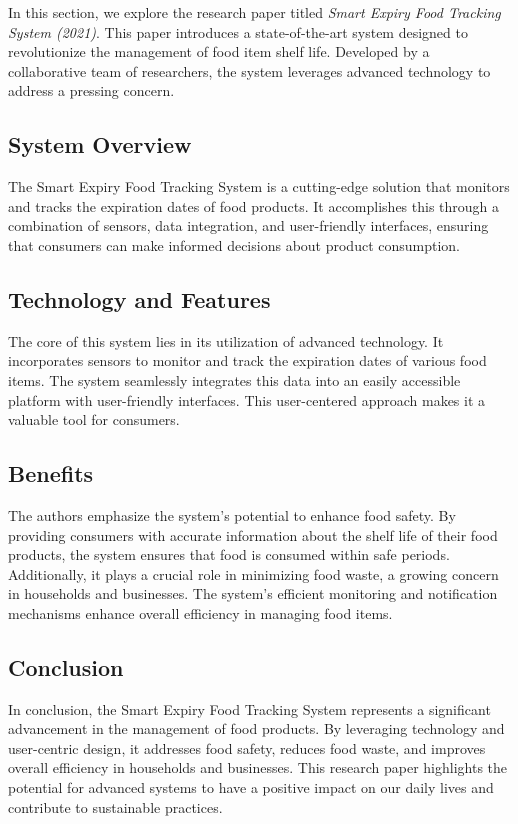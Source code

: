 In this section, we explore the research paper titled \textit{Smart Expiry Food Tracking System (2021)}. This paper introduces a state-of-the-art system designed to revolutionize the management of food item shelf life. Developed by a collaborative team of researchers, the system leverages advanced technology to address a pressing concern.

\subsection{System Overview}

The Smart Expiry Food Tracking System is a cutting-edge solution that monitors and tracks the expiration dates of food products. It accomplishes this through a combination of sensors, data integration, and user-friendly interfaces, ensuring that consumers can make informed decisions about product consumption.

\subsection{Technology and Features}

The core of this system lies in its utilization of advanced technology. It incorporates sensors to monitor and track the expiration dates of various food items. The system seamlessly integrates this data into an easily accessible platform with user-friendly interfaces. This user-centered approach makes it a valuable tool for consumers.

\subsection{Benefits}

The authors emphasize the system's potential to enhance food safety. By providing consumers with accurate information about the shelf life of their food products, the system ensures that food is consumed within safe periods. Additionally, it plays a crucial role in minimizing food waste, a growing concern in households and businesses. The system's efficient monitoring and notification mechanisms enhance overall efficiency in managing food items.

\subsection{Conclusion}

In conclusion, the Smart Expiry Food Tracking System represents a significant advancement in the management of food products. By leveraging technology and user-centric design, it addresses food safety, reduces food waste, and improves overall efficiency in households and businesses. This research paper highlights the potential for advanced systems to have a positive impact on our daily lives and contribute to sustainable practices.



